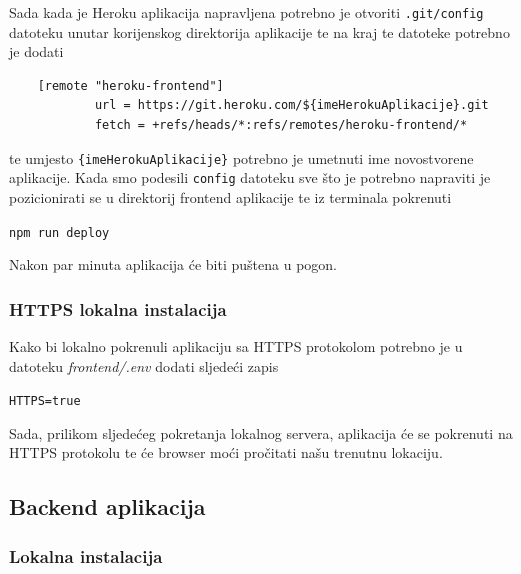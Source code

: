 		        		Sada kada je Heroku aplikacija napravljena potrebno je otvoriti \texttt{.git/config} datoteku unutar korijenskog direktorija aplikacije te na kraj te datoteke potrebno je dodati

                \begin{verbatim}
    [remote "heroku-frontend"]
        	url = https://git.heroku.com/${imeHerokuAplikacije}.git
        	fetch = +refs/heads/*:refs/remotes/heroku-frontend/*
								\end{verbatim}
								
								te umjesto \texttt{\{imeHerokuAplikacije\}} potrebno je umetnuti ime novostvorene aplikacije. Kada smo podesili \texttt{config} datoteku sve što je potrebno napraviti je pozicionirati se u direktorij frontend aplikacije te iz terminala pokrenuti 

								\begin{center}
										\texttt{npm run deploy}
								\end{center}
								
								Nakon par minuta aplikacija će biti puštena u pogon.

						\pagebreak

						\subsubsection*{HTTPS lokalna instalacija}

								Kako bi lokalno pokrenuli aplikaciju sa HTTPS protokolom potrebno je u datoteku \textit{frontend/.env} dodati sljedeći zapis

								\begin{center}
										\texttt{HTTPS=true}
								\end{center}

								Sada, prilikom sljedećeg pokretanja lokalnog servera, aplikacija će se pokrenuti na HTTPS protokolu te će browser moći pročitati našu trenutnu lokaciju.

						\pagebreak

						\subsection{Backend aplikacija}
	        
						\subsubsection*{Lokalna instalacija}
	        
